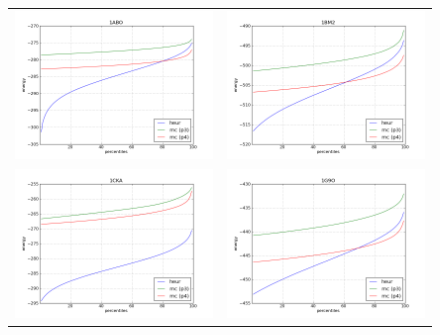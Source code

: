 \documentclass[a4paper,12pt]{article}
\begin{document}
   \begin{figure}[t]
     \centering
     \begin{tabular}{cc}
       \includegraphics[width=8.45cm]{images/1ABO_centiles.png} &
       \includegraphics[width=8.45cm]{images/1BM2_centiles.png} \\
       \includegraphics[width=8.45cm]{images/1CKA_centiles.png} &
       \includegraphics[width=8.45cm]{images/1G9O_centiles.png} \\

\end{tabular}
\end{figure}
\end{document}
